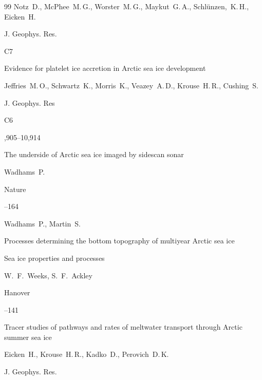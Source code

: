 \begin{thebibliography}{99}
\by Notz~D., McPhee~M.\,G., Worster~M.\,G., Maykut~G.\,A., Schl\"unzen,~K.\,H., Eicken~H.

\jour J. Geophys. Res.



\issue C7






\paper Evidence for platelet ice accretion in Arctic sea ice development

\by Jeffries~M.\,O., Schwartz~K., Morris~K., Veazey~A.\,D., Krouse~H.\,R., Cushing~S.

\jour J. Geophys. Res



\issue C6

,905--10,914






\paper The underside of Arctic sea ice imaged by sidescan sonar

\by Wadhams~P.

\jour Nature



--164




\by Wadhams~P., Martin~S.

\paper Processes determining the bottom topography of multiyear Arctic sea ice

\inbook Sea ice properties and processes

\eds W.~F.~Weeks, S.~F.~Ackley

\publaddr Hanover


--141




\paper Tracer studies of pathways and rates of meltwater transport through Arctic summer sea ice

\by Eicken~H., Krouse~H.\,R., Kadko~D., Perovich~D.\,K.

\jour J. Geophys. Res.


\end{thebibliography}
